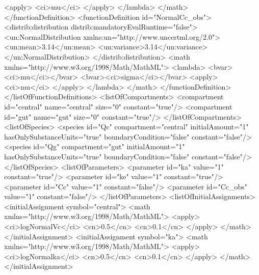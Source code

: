 \documentclass[draftspec]{sbmlpkgspec}
\begin{document}
\begin{example}
                        <apply>
                          <ci>mu</ci>
                        </apply>
                    </lambda>
                </math>
            </functionDefinition>
            <functionDefinition id="NormalCc_obs">
                <distrib:distribution distrib:mandatoryEvalRuntime="false">
                    <un:NormalDistribution xmlns:un="http://www.uncertml.org/2.0">
                        <un:mean>3.14</un:mean>
                        <un:variance>3.14</un:variance>
                    </un:NormalDistribution>
                </distrib:distribution>
                <math xmlns="http://www.w3.org/1998/Math/MathML">
                    <lambda>
                        <bvar><ci>mu</ci></bvar>
                        <bvar><ci>sigma</ci></bvar> 
                        <apply>
                          <ci>mu</ci>
                        </apply>
                    </lambda>
                </math>
            </functionDefinition>
        </listOfFunctionDefinitions>
        <listOfCompartments>
            <compartment id="central" name="central" size="0" constant="true"/>
            <compartment id="gut" name="gut" size="0" constant="true"/>
        </listOfCompartments>
        <listOfSpecies>
            <species id="Qc" compartment="central" initialAmount="1"
               hasOnlySubstanceUnits="true" boundaryCondition="false" constant="false"/>
            <species id="Qg" compartment="gut" initialAmount="1"
               hasOnlySubstanceUnits="true" boundaryCondition="false" constant="false"/>
        </listOfSpecies>
        <listOfParameters>
            <parameter id="ka" value="1" constant="true"/>
            <parameter id="ke" value="1" constant="true"/>
            <parameter id="Cc" value="1" constant="false"/>
            <parameter id="Cc_obs" value="1" constant="false"/>
        </listOfParameters>
        <listOfInitialAssignments>
            <initialAssignment symbol="central">
                <math xmlns="http://www.w3.org/1998/Math/MathML"> 
                    <apply>
                        <ci>logNormalVc</ci>
                        <cn>0.5</cn>
                        <cn>0.1</cn>
                    </apply>
                </math>
            </initialAssignment>
            <initialAssignment symbol="ka">
                <math xmlns="http://www.w3.org/1998/Math/MathML"> 
                    <apply>
                        <ci>logNormalka</ci>
                        <cn>0.5</cn>
                        <cn>0.1</cn>
                    </apply>
                </math>
            </initialAssignment>

\end{example}
\end{document}
